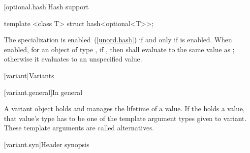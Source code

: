 [optional.hash]{Hash support}

%
\begin{itemdecl}
template <class T> struct hash<optional<T>>;
\end{itemdecl}

\begin{itemdescr}
\pnum
The specialization  is enabled~(\ref{unord.hash})
if and only if  is enabled.
When enabled, for an object  of type ,
if , then 
shall evaluate to the same value as ;
otherwise it evaluates to an unspecified value.
\end{itemdescr}


[variant]{Variants}

[variant.general]{In general}

\pnum
A variant object holds and manages the lifetime of a value.
If the  holds a value, that value's type has to be one
of the template argument types given to variant.
These template arguments are called alternatives.

[variant.syn]{Header  synopsis}
%
%

